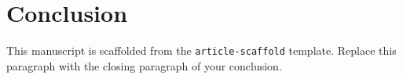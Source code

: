 \section{Conclusion}
\label{sec:conclusion}

%

This manuscript is scaffolded from the \texttt{article-scaffold} template.
Replace this paragraph with the closing paragraph of your conclusion.
